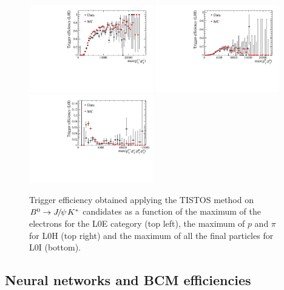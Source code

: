 \begin{figure}[h!]
\centering
\includegraphics[width=0.48\textwidth]{RKst/figs/TisTos_vs_maxPTLL_L0E.pdf}
\includegraphics[width=0.48\textwidth]{RKst/figs/TisTos_vs_maxPTHH_L0H.pdf}
\includegraphics[width=0.48\textwidth]{RKst/figs/TisTos_vs_maxPT_L0I.pdf}
\caption{Trigger efficiency obtained applying the TISTOS method on $\Bz\to\jpsi\Kstar$ candidates
as a function of the maximum \pt of the electrons for the L0E category (top left), the maximum \pt
of $p$ and $\pi$ for L0H (top right) and the maximum \pt of all the final particles for L0I (bottom).}
\label{fig:tistos_vs_pt}
\end{figure}


\subsection{Neural networks and BCM efficiencies}
\label{sec:Rkst_mva_eff}

